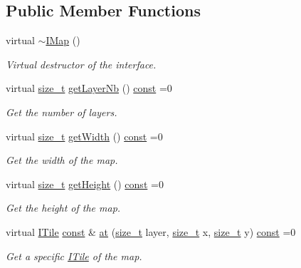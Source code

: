\subsection*{Public Member Functions}
\begin{DoxyCompactItemize}
\item 
virtual \hyperlink{classarcade_1_1_i_map_aaa3aa1b624552b9ab830067ab42f78dd}{$\sim$\-I\-Map} ()
\begin{DoxyCompactList}\small\item\em Virtual destructor of the interface. \end{DoxyCompactList}\item 
virtual \hyperlink{nc__alloc_8h_a7b60c5629e55e8ec87a4547dd4abced4}{size\-\_\-t} \hyperlink{classarcade_1_1_i_map_a3e5fc4c5286f92fb49c8c7d0e79f4510}{get\-Layer\-Nb} () \hyperlink{term__entry_8h_a57bd63ce7f9a353488880e3de6692d5a}{const} =0
\begin{DoxyCompactList}\small\item\em Get the number of layers. \end{DoxyCompactList}\item 
virtual \hyperlink{nc__alloc_8h_a7b60c5629e55e8ec87a4547dd4abced4}{size\-\_\-t} \hyperlink{classarcade_1_1_i_map_a6e7534eeff05277f1429037f8b01e25f}{get\-Width} () \hyperlink{term__entry_8h_a57bd63ce7f9a353488880e3de6692d5a}{const} =0
\begin{DoxyCompactList}\small\item\em Get the width of the map. \end{DoxyCompactList}\item 
virtual \hyperlink{nc__alloc_8h_a7b60c5629e55e8ec87a4547dd4abced4}{size\-\_\-t} \hyperlink{classarcade_1_1_i_map_a9282ac731fa61b8c18241a309efbd6a0}{get\-Height} () \hyperlink{term__entry_8h_a57bd63ce7f9a353488880e3de6692d5a}{const} =0
\begin{DoxyCompactList}\small\item\em Get the height of the map. \end{DoxyCompactList}\item 
virtual \hyperlink{classarcade_1_1_i_tile}{I\-Tile} \hyperlink{term__entry_8h_a57bd63ce7f9a353488880e3de6692d5a}{const} \& \hyperlink{classarcade_1_1_i_map_ab856c3bcc5a39d987d2a40fd05c35d0e}{at} (\hyperlink{nc__alloc_8h_a7b60c5629e55e8ec87a4547dd4abced4}{size\-\_\-t} layer, \hyperlink{nc__alloc_8h_a7b60c5629e55e8ec87a4547dd4abced4}{size\-\_\-t} x, \hyperlink{nc__alloc_8h_a7b60c5629e55e8ec87a4547dd4abced4}{size\-\_\-t} y) \hyperlink{term__entry_8h_a57bd63ce7f9a353488880e3de6692d5a}{const} =0
\begin{DoxyCompactList}\small\item\em Get a specific \hyperlink{classarcade_1_1_i_tile}{I\-Tile} of the map. \end{DoxyCompactList}\end{DoxyCompactItemize}


